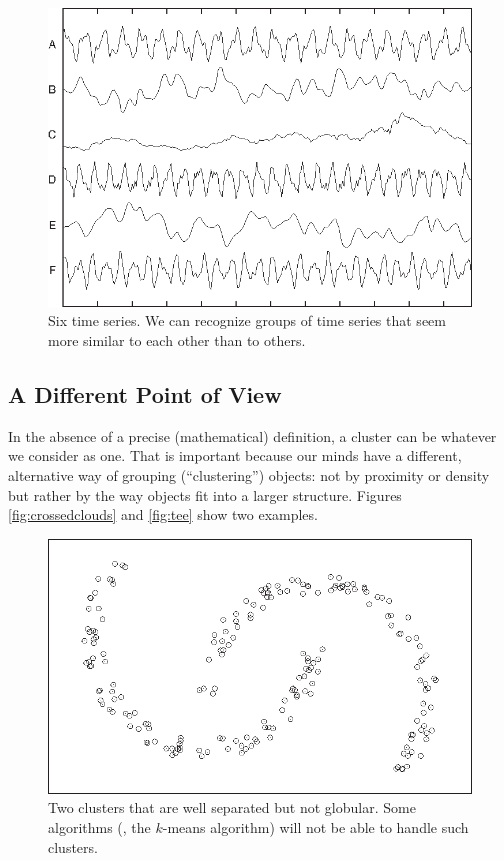 \begin{figure}
  \centerline{\includegraphics{img/timeseriescluster}}
  \caption{Six time series. We can recognize groups of time series that
    seem more similar to each other than to others.}
  \label{fig:timeseriescluster}\vspace*{-6pt}
\end{figure}


\subsection{A Different Point of View}

In the absence of a precise (mathematical) definition, a cluster can
be whatever we consider as one. That is important because our minds
have a different, alternative way of grouping (``clustering'')
objects: not by proximity or density but rather by the way objects fit
into a larger structure. Figures \ref{fig:crossedclouds} and
\ref{fig:tee} show two examples.


\begin{figure}
  \centerline{\includegraphics{img/bananas}}
  \caption{Two clusters that are well separated but not globular.
    Some algorithms (\eg, the $k$-means algorithm) will not be able to
    handle such clusters.}
  \label{fig:bananas}
\end{figure}

